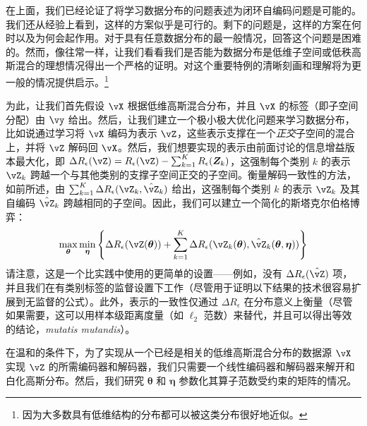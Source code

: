 \documentclass[../../book-main.tex]{subfiles}
\begin{document}
在上面，我们已经论证了将学习数据分布的问题表述为闭环自编码问题是可能的。我们还从经验上看到，这样的方案似乎是可行的。剩下的问题是，这样的方案在何时以及为何会起作用。对于具有任意数据分布的最一般情况，回答这个问题是困难的。然而，像往常一样，让我们看看我们是否能为数据分布是低维子空间或低秩高斯混合的理想情况得出一个严格的证明。对这个重要特例的清晰刻画和理解将为更一般的情况提供启示。\footnote{因为大多数具有低维结构的分布都可以被这类分布很好地近似。}

为此，让我们首先假设 \(\vX\) 根据低维高斯混合分布，并且 \(\vX\) 的标签（即子空间分配）由 \(\vy\) 给出。然后，让我们建立一个极小极大优化问题来学习数据分布，比如说通过学习将 \(\vX\) 编码为表示 \(\vZ\)，这些表示支撑在一个\textit{正交}子空间的混合上，并将 \(\vZ\) 解码回 \(\vX\)。然后，我们想要实现的表示由前面讨论的信息增益版本最大化，即 \( \Delta R_{\epsilon}(\vZ) = R_{\epsilon}(\vZ) - \sum_{k=1}^K R_{\epsilon}(\bm Z_k) \)，这强制每个类别 \(k\) 的表示 \(\vZ_{k}\) 跨越一个与其他类别的支撑子空间正交的子空间。衡量解码一致性的方法，如前所述，由 \(\sum_{k = 1}^{K}\Delta R_\epsilon(\vZ_{k}, \hat{\vZ}_{k})\) 给出，这强制每个类别 \(k\) 的表示 \(\vZ_{k}\) 及其自编码 \(\hat{\vZ}_{k}\) 跨越相同的子空间。因此，我们可以建立一个简化的斯塔克尔伯格博弈：
\begin{equation}\label{eq:ctrl_msp_game}
    \max_{\bm \theta}\min_{\bm \eta}\bc{\Delta R_\epsilon(\vZ(\bm \theta)) + \sum_{k = 1}^{K}\Delta R_\epsilon(\vZ_{k}(\bm \theta), \hat{\vZ}_{k}(\bm \theta, \bm \eta))}
\end{equation}
请注意，这是一个比实践中使用的更简单的设置——例如，没有 \(\Delta R_\epsilon(\hat{\vZ})\) 项，并且我们在有类别标签的监督设置下工作（尽管用于证明以下结果的技术很容易扩展到无监督的公式）。此外，表示的一致性仅通过 \(\Delta R_\epsilon\) 在分布意义上衡量（尽管如果需要，这可以用样本级距离度量（如 \(\ell_{2}\) 范数）来替代，并且可以得出等效的结论，\textit{mutatis mutandis}）。

在温和的条件下，为了实现从一个已经是相关的低维高斯混合分布的数据源 \(\vX\) 实现 \(\vZ\) 的所需编码器和解码器，我们只需要一个线性编码器和解码器来解开和白化高斯分布。然后，我们研究 \(\bm \theta\) 和 \(\bm \eta\) 参数化其算子范数受约束的矩阵的情况。
\end{document}
